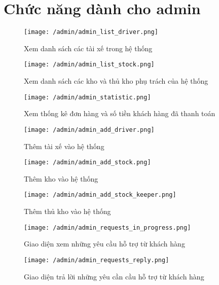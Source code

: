 			\section{Chức năng dành cho admin}
				\begin{figure}[H]
					\texttt{[image: /admin/admin\_list\_driver.png]}
					\centering
					\caption{Xem danh sách các tài xế trong hệ thống}
				\end{figure}
				
				\begin{figure}[H]
					\texttt{[image: /admin/admin\_list\_stock.png]}
					\centering
					\caption{Xem danh sách các kho và thủ kho phụ trách của hệ thống}
				\end{figure}
			
				\begin{figure}[H]
					\texttt{[image: /admin/admin\_statistic.png]}
					\centering
					\caption{Xem thống kê đơn hàng và số tiền khách hàng đã thanh toán}
				\end{figure}
			
				\begin{figure}[H]
					\texttt{[image: /admin/admin\_add\_driver.png]}
					\centering
					\caption{Thêm tài xế vào hệ thống}
				\end{figure}
			
				\begin{figure}[H]
					\texttt{[image: /admin/admin\_add\_stock.png]}
					\centering
					\caption{Thêm kho vào hệ thống}
				\end{figure}
			
				\begin{figure}[H]
					\texttt{[image: /admin/admin\_add\_stock\_keeper.png]}
					\centering
					\caption{Thêm thủ kho vào hệ thống}
				\end{figure}
			
				\begin{figure}[H]
					\texttt{[image: /admin/admin\_requests\_in\_progress.png]}
					\centering
					\caption{Giao diện xem những yêu cầu hỗ trợ từ khách hàng}
				\end{figure}
			
				\begin{figure}[H]
					\texttt{[image: /admin/admin\_requests\_reply.png]}
					\centering
					\caption{Giao diện trả lời những yêu cần cầu hỗ trợ từ khách hàng}
				\end{figure}
			
